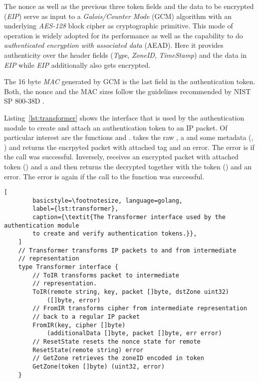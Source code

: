 The nonce as well as the previous three token fields and the data to be encrypted (\textit{EIP})
serve as input to a \textit{Galois/Counter Mode} (GCM) algorithm with an underlying
\textit{AES-128} block cipher as cryptographic primitive. This mode of operation is widely
adopted for its performance as well as the capability to do \textit{authenticated encryption
	with associated data} (AEAD). Here it provides authenticity over the header fields
(\textit{Type}, \textit{ZoneID}, \textit{TimeStamp}) and the data in \textit{EIP} while
\textit{EIP} additionally also gets encrypted.

The 16 byte \textit{MAC} generated by GCM is the last field in the authentication token. Both,
the nonce and the MAC sizes follow the guidelines recommended by NIST SP 800-38D \cite{nistgcm}.

Listing~\ref{lst:transformer} shows the interface that is used by the authentication module
to create and attach an authentication token to an IP packet. Of particular interest are the
functions  and .  takes the raw
, a  and some metadata (, ) and returns the
encrpyted packet with attached tag and an error. The error is  if the
call was successful.
Inversely,  receives an encrypted packet with attached token () and
a  and then returns the decrypted  together with the token ()
and an error. The error is again  if the
call to the function was successful.

\begin{minipage}{\linewidth} %
	\begin{lstlisting}[
		basicstyle=\footnotesize, language=golang,
		label={lst:transformer},
		caption={\textit{The Transformer interface used by the authentication module 
		to create and verify authentication tokens.}},
	]
	// Transformer transforms IP packets to and from intermediate
	// representation
	type Transformer interface {
		// ToIR transforms packet to intermediate
		// representation.
		ToIR(remote string, key, packet []byte, dstZone uint32)
			([]byte, error)
		// FromIR transforms cipher from intermediate representation
		// back to a regular IP packet
		FromIR(key, cipher []byte)
			(additionalData []byte, packet []byte, err error)
		// ResetState resets the nonce state for remote	
		ResetState(remote string) error
		// GetZone retrieves the zoneID encoded in token
		GetZone(token []byte) (uint32, error)
	}
	\end{lstlisting}
\end{minipage}
